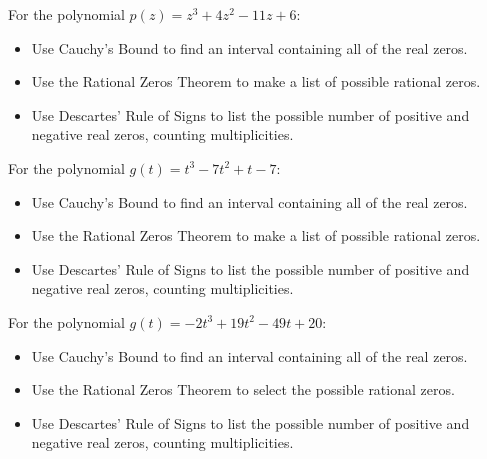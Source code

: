 \documentclass{ximera}
\begin{document}
\begin{problem}
For the polynomial $p(z) = z^{3} + 4z^{2} - 11z + 6$:

\begin{itemize}
\item  Use Cauchy's Bound to find an interval containing all of the real zeros.
\item  Use the Rational Zeros Theorem to make a list of possible rational zeros.
\item  Use Descartes' Rule of Signs to list the possible number of positive and negative real zeros, counting multiplicities.
\end{itemize}
\end{problem}

\begin{problem}
For the polynomial $g(t) = t^{3} - 7t^{2} + t - 7$:

\begin{itemize}
\item  Use Cauchy's Bound to find an interval containing all of the real zeros.
\item  Use the Rational Zeros Theorem to make a list of possible rational zeros.
\item  Use Descartes' Rule of Signs to list the possible number of positive and negative real zeros, counting multiplicities.
\end{itemize}
\end{problem}

\begin{problem}
For the polynomial $g(t) = -2t^{3} + 19t^{2} - 49t + 20$:

\begin{itemize}
\item  Use Cauchy's Bound to find an interval containing all of the real zeros.
\item  Use the Rational Zeros Theorem to select the possible rational zeros.
\begin{selectAll}
  \end{selectAll}
\item  Use Descartes' Rule of Signs to list the possible number of positive and negative real zeros, counting multiplicities.
\end{itemize}
\end{problem}
\end{document}
